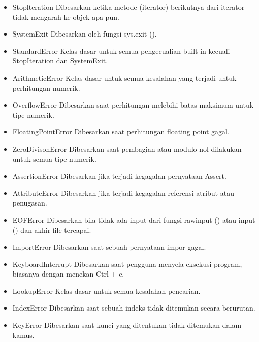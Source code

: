 \begin{enumerate}
\begin{itemize}
        \item Stoplteration
        Dibesarkan ketika metode (iterator) berikutnya dari iterator tidak mengarah ke objek apa pun.

        \item SystemExit
        Dibesarkan oleh fungsi sys.exit ().

        \item StandardError
        Kelas dasar untuk semua pengecualian built-in kecuali StopIteration dan SystemExit.

        \item ArithmeticError
        Kelas dasar untuk semua kesalahan yang terjadi untuk perhitungan numerik.

        \item OverflowError
        Dibesarkan saat perhitungan melebihi batas maksimum untuk tipe numerik.

        \item FloatingPointError
        Dibesarkan saat perhitungan floating point gagal.

        \item ZeroDivisonError
        Dibesarkan saat pembagian atau modulo nol dilakukan untuk semua tipe numerik.

        \item AssertionError
        Dibesarkan jika terjadi kegagalan pernyataan Assert.

        \item AttributeError
        Dibesarkan jika terjadi kegagalan referensi atribut atau penugasan.
         
        \item EOFError
        Dibesarkan bila tidak ada input dari fungsi rawinput () atau input () dan akhir file tercapai.

        \item ImportError
        Dibesarkan saat sebuah pernyataan impor gagal.

        \item KeyboardInterrupt
        Dibesarkan saat pengguna menyela eksekusi program, biasanya dengan menekan Ctrl + c.

        \item LookupError
        Kelas dasar untuk semua kesalahan pencarian.

        \item IndexError
        Dibesarkan saat sebuah indeks tidak ditemukan secara berurutan.

        \item KeyError
        Dibesarkan saat kunci yang ditentukan tidak ditemukan dalam kamus.


\end{itemize}
\end{enumerate}
